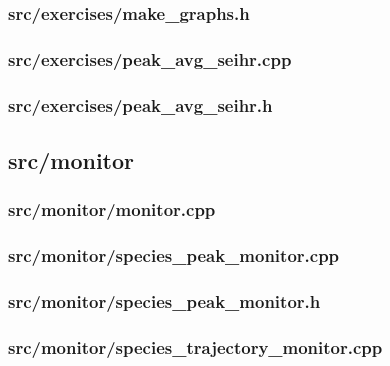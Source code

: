 \subsubsection{src/exercises/make\_graphs.h}

\newpage
\subsubsection{src/exercises/peak\_avg\_seihr.cpp}

\newpage
\subsubsection{src/exercises/peak\_avg\_seihr.h}


\newpage
\subsection{src/monitor}
\subsubsection{src/monitor/monitor.cpp}

\newpage
\subsubsection{src/monitor/species\_peak\_monitor.cpp}

\newpage
\subsubsection{src/monitor/species\_peak\_monitor.h}

\newpage
\subsubsection{src/monitor/species\_trajectory\_monitor.cpp}

\newpage
